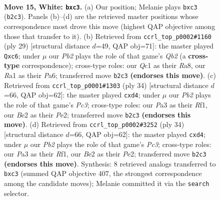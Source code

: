 \documentclass[11pt]{article}
\begin{document}
\clearpage

\begin{figure}[p]\centering
\begin{subfigure}{0.46\textwidth}\centering
\resizebox{\linewidth}{!}{%
\newchessgame
\chessboard[
  setfen={r3r1k1/1p1bqppp/p1n1p3/2Pp4/3P4/P1n2N1P/1P2BPP1/R1Q2RK1 w - - 0 15},
  showmover=false,
  pgfstyle=straightmove, color=movearrow, markmove={b2-c3}
]}
\caption{}
\end{subfigure}\hfill
\begin{subfigure}{0.46\textwidth}\centering
\resizebox{\linewidth}{!}{%
\newchessgame
\chessboard[
  setfen={r4rk1/1q1pbpp1/ppN1pn1p/8/2P5/1PNQ2P1/PB2PP1P/R2R2K1 b - - 0 15},
  showmover=false,
  pgfstyle=straightmove, color=movearrow, markmove={b7-c6}
]}
\caption{}
\end{subfigure}
\\[4pt]
\begin{subfigure}{0.46\textwidth}\centering
\resizebox{\linewidth}{!}{%
\newchessgame
\chessboard[
  setfen={r3qrk1/p1p3pp/1p1pp3/2b1N3/2Pn1B2/2P3P1/P3PPKP/3QRR2 w - - 0 18},
  showmover=false,
  pgfstyle=straightmove, color=movearrow, markmove={c3-d4}
]}
\caption{}
\end{subfigure}\hfill
\begin{subfigure}{0.46\textwidth}\centering
\resizebox{\linewidth}{!}{%
\newchessgame
\chessboard[
  setfen={r3qrk1/p1p3pp/1p1pp3/2b1N3/2Pn1B2/2P3P1/P3PPKP/3QRR2 w - - 0 18},
  showmover=false,
  pgfstyle=straightmove, color=movearrow, markmove={c3-d4}
]}
\caption{}
\end{subfigure}
\caption{\textbf{Move 15, White: \texttt{bxc3}.} (a) Our position; Melanie plays \texttt{bxc3} (\texttt{b2c3}). Panels (b)--(d) are the retrieved master positions whose correspondence most drove this move (highest QAP objective among those that transfer to it). (b) Retrieved from \texttt{ccrl\_top\_p0002\#1160} (ply 29) [structural distance $d$=49, QAP obj=71]: the master played \texttt{Qxc6}; under $\mu$ our \emph{Pb2} plays the role of that game's \emph{Qb2} (a \textbf{cross-type} correspondence); cross-type roles: our \emph{Q}c1 as their \emph{R}a8, our \emph{R}a1 as their \emph{P}a6; transferred move \texttt{b2c3} \textbf{(endorses this move)}. (c) Retrieved from \texttt{ccrl\_top\_p0001\#1303} (ply 34) [structural distance $d$=66, QAP obj=62]: the master played \texttt{cxd4}; under $\mu$ our \emph{Pb2} plays the role of that game's \emph{Pc3}; cross-type roles: our \emph{P}a3 as their \emph{R}f1, our \emph{B}e2 as their \emph{P}e2; transferred move \texttt{b2c3} \textbf{(endorses this move)}. (d) Retrieved from \texttt{ccrl\_top\_p0002\#3252} (ply 34) [structural distance $d$=66, QAP obj=62]: the master played \texttt{cxd4}; under $\mu$ our \emph{Pb2} plays the role of that game's \emph{Pc3}; cross-type roles: our \emph{P}a3 as their \emph{R}f1, our \emph{B}e2 as their \emph{P}e2; transferred move \texttt{b2c3} \textbf{(endorses this move)}. Synthesis: 8 retrieved analogs transferred to \texttt{bxc3} (summed QAP objective 407, the strongest correspondence among the candidate moves); Melanie committed it via the \texttt{search} selector.}
\label{fig:thought-m28}
\end{figure}
\end{document}
